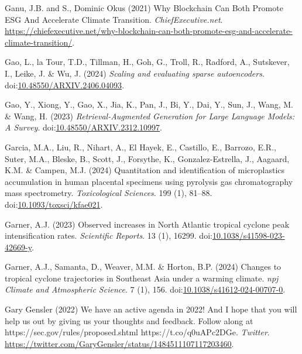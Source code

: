 \documentclass[
  letterpaper,
  DIV=11,
  numbers=noendperiod]{scrartcl}
\newlength{\cslhangindent}
\newenvironment{CSLReferences}[2] %
 {\begin{list}{}{%
  \setlength{\itemindent}{0pt}
  \setlength{\leftmargin}{0pt}
  \setlength{\parsep}{0pt}
  \ifodd #1
   \setlength{\leftmargin}{\cslhangindent}
   \setlength{\itemindent}{-1\cslhangindent}
  \fi
  \setlength{\itemsep}{#2\baselineskip}}}
 {\end{list}}
\begin{document}
\begin{CSLReferences}{0}{1}
Ganu, J.B. and S., Dominic Okus (2021) Why {Blockchain Can Both Promote
ESG And Accelerate Climate Transition}. \emph{ChiefExecutive.net}.
\url{https://chiefexecutive.net/why-blockchain-can-both-promote-esg-and-accelerate-climate-transition/}.

Gao, L., la Tour, T.D., Tillman, H., Goh, G., Troll, R., Radford, A.,
Sutskever, I., Leike, J. \& Wu, J. (2024) \emph{Scaling and evaluating
sparse autoencoders}.
doi:\href{https://doi.org/10.48550/ARXIV.2406.04093}{10.48550/ARXIV.2406.04093}.

Gao, Y., Xiong, Y., Gao, X., Jia, K., Pan, J., Bi, Y., Dai, Y., Sun, J.,
Wang, M. \& Wang, H. (2023) \emph{Retrieval-{Augmented Generation} for
{Large Language Models}: {A Survey}}.
doi:\href{https://doi.org/10.48550/ARXIV.2312.10997}{10.48550/ARXIV.2312.10997}.

Garcia, M.A., Liu, R., Nihart, A., El Hayek, E., Castillo, E., Barrozo,
E.R., Suter, M.A., Bleske, B., Scott, J., Forsythe, K.,
Gonzalez-Estrella, J., Aagaard, K.M. \& Campen, M.J. (2024) Quantitation
and identification of microplastics accumulation in human placental
specimens using pyrolysis gas chromatography mass spectrometry.
\emph{Toxicological Sciences}. 199 (1), 81--88.
doi:\href{https://doi.org/10.1093/toxsci/kfae021}{10.1093/toxsci/kfae021}.

Garner, A.J. (2023) Observed increases in {North Atlantic} tropical
cyclone peak intensification rates. \emph{Scientific Reports}. 13 (1),
16299.
doi:\href{https://doi.org/10.1038/s41598-023-42669-y}{10.1038/s41598-023-42669-y}.

Garner, A.J., Samanta, D., Weaver, M.M. \& Horton, B.P. (2024) Changes
to tropical cyclone trajectories in {Southeast Asia} under a warming
climate. \emph{npj Climate and Atmospheric Science}. 7 (1), 156.
doi:\href{https://doi.org/10.1038/s41612-024-00707-0}{10.1038/s41612-024-00707-0}.

Gary Gensler (2022) We have an active agenda in 2022! {And I} hope that
you will help us out by giving us your thoughts and feedback. {Follow}
along at {https://sec.gov/rules/proposed.shtml}
{https://t.co/q0uAPc2DGe}. \emph{Twitter}.
\url{https://twitter.com/GaryGensler/status/1484511107117203460}.


\end{CSLReferences}
\end{document}
